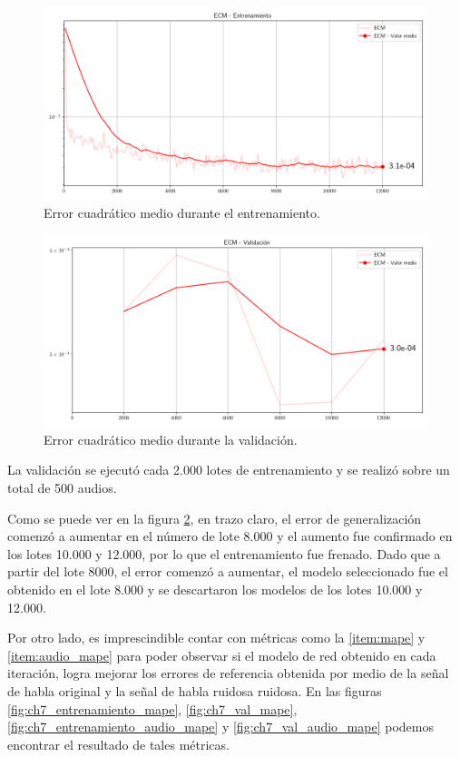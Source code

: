 \begin{figure}
	\centering
	\centerline{\includegraphics[scale=0.65]{images/ch7/entrenamiento/train_mse.png}}
	\caption{Error cuadrático medio durante el entrenamiento.}
	\label{fig:ch7_entrenamiento_mse}
\end{figure}

\begin{figure}
	\centering
	\centerline{\includegraphics[scale=0.65]{images/ch7/entrenamiento/val_mse.png}}
	\caption{Error cuadrático medio durante la validación.}
	\label{fig:ch7_validacion_mse}
\end{figure}

La validación se ejecutó cada 2.000 lotes de entrenamiento y se realizó sobre un total de 500 audios.

Como se puede ver en la figura \ref{fig:ch7_validacion_mse}, en trazo claro, el error de generalización comenzó a aumentar en el número de lote 8.000 y el aumento fue confirmado en los lotes 10.000 y 12.000, por lo que el entrenamiento fue frenado. Dado que a partir del lote 8000, el error comenzó a aumentar, el modelo seleccionado fue el obtenido en el lote 8.000 y se descartaron los modelos de los lotes 10.000 y 12.000.

Por otro lado, es imprescindible contar con métricas como la \ref{item:mape} y \ref{item:audio_mape} para poder observar si el modelo de red obtenido en cada iteración, logra mejorar los errores de referencia obtenida por medio de la señal de habla original y la señal de habla ruidosa ruidosa. En las figuras \ref{fig:ch7_entrenamiento_mape}, \ref{fig:ch7_val_mape}, \ref{fig:ch7_entrenamiento_audio_mape} y \ref{fig:ch7_val_audio_mape} podemos encontrar el resultado de tales métricas.


